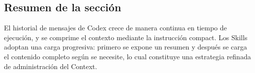 \subsection{Resumen de la sección}

El historial de mensajes de Codex crece de manera continua en tiempo de ejecución, y se comprime el contexto mediante la instrucción compact. Los Skills adoptan una carga progresiva: primero se expone un resumen y después se carga el contenido completo según se necesite, lo cual constituye una estrategia refinada de administración del Context.
